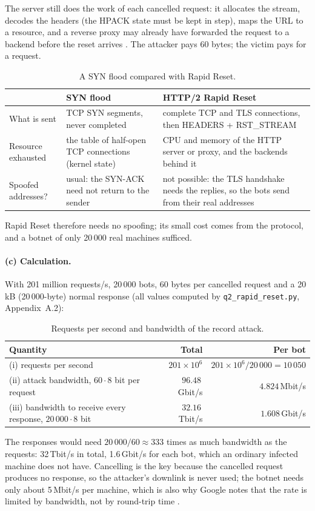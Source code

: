 \documentclass[11pt,a4paper]{article}
\newcommand{\code}[1]{\texttt{#1}}
\begin{document}
The server still does the work of each cancelled request: it allocates the stream, decodes the headers (the HPACK
state must be kept in step), maps the URL to a resource, and a reverse proxy may already have forwarded the request to a
backend before the reset arrives \cite{googlehow}. The attacker pays 60 bytes; the victim pays for a request.
\begin{table}[H]
\centering\small
\begin{tabularx}{\textwidth}{@{}P{2.6cm}LL@{}}
\toprule
 & SYN flood & HTTP/2 Rapid Reset \\
\midrule
What is sent & TCP SYN segments, never completed & complete TCP and TLS connections, then HEADERS + RST\_STREAM \\
Resource exhausted & the table of half-open TCP connections (kernel state) & CPU and memory of the HTTP server or proxy, and the
backends behind it \\
Spoofed addresses? & usual: the SYN-ACK need not return to the sender & not possible: the TLS handshake needs the
replies, so the bots send from their real addresses \\
\bottomrule
\end{tabularx}
\caption{A SYN flood compared with Rapid Reset.}\label{tab:synvsrr}
\end{table}
Rapid Reset therefore needs no spoofing; its small cost comes from the protocol, and a botnet of only 20\,000 real
machines sufficed.

\paragraph{(c) Calculation.} With 201 million requests/s, 20\,000 bots, 60 bytes per cancelled request and a
20\,kB (20\,000-byte) normal response (all values computed by \code{q2\_rapid\_reset.py}, Appendix~A.2):
\begin{table}[H]
\centering\small
\begin{tabular}{@{}lrr@{}}
\toprule
Quantity & Total & Per bot \\
\midrule
(i) requests per second & $201\times10^{6}$ & $201\times10^{6}/20\,000 = 10\,050$ \\
(ii) attack bandwidth, $60\cdot8$ bit per request & $96.48$\,Gbit/s & $4.824$\,Mbit/s \\
(iii) bandwidth to receive every response, $20\,000\cdot8$ bit & $32.16$\,Tbit/s & $1.608$\,Gbit/s \\
\bottomrule
\end{tabular}
\caption{Requests per second and bandwidth of the record attack.}
\end{table}
The responses would need $20\,000/60\approx333$ times as much bandwidth as the requests: 32\,Tbit/s in total, 1.6\,Gbit/s
for each bot, which an ordinary infected machine does not have. Cancelling is the key because the cancelled request
produces no response, so the attacker's downlink is never used; the botnet needs only about 5\,Mbit/s per machine, which
is also why Google notes that the rate is limited by bandwidth, not by round-trip time \cite{googlehow}.
\end{document}
